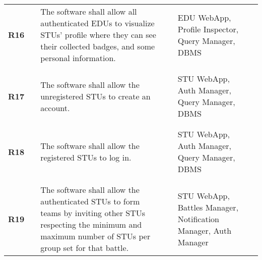 \begin{longtable}[H]{l l p{6cm} l p{4cm} l}
    \textbf{R16}            & \vline & The software shall allow all authenticated EDUs to visualize STUs' profile where they can see their collected badges, and some personal information.                                                                                                                         & \vline &  EDU WebApp, Profile Inspector, Query Manager, DBMS \\          
                            &        &                                                                                                                                                                                                                                                                              &        &       \\\hline  & & \\ 
    \textbf{R17}            & \vline & The software shall allow the unregistered STUs to create an account.                                                                                                                                                                                                         & \vline &  STU WebApp, Auth Manager, Query Manager, DBMS \\          
                            &        &                                                                                                                                                                                                                                                                              &        &       \\\hline  & & \\ 
    \textbf{R18}            & \vline & The software shall allow the registered STUs to log in.                                                                                                                                                                                                                      & \vline &  STU WebApp, Auth Manager, Query Manager, DBMS \\          
                            &        &                                                                                                                                                                                                                                                                              &        &       \\\hline  & & \\ 
    \textbf{R19}            & \vline & The software shall allow the authenticated STUs to form teams by inviting other STUs respecting the minimum and maximum number of STUs per group set for that battle.                                                                                                        & \vline &  STU WebApp, Battles Manager, Notification Manager, Auth Manager\\          

\end{longtable}
